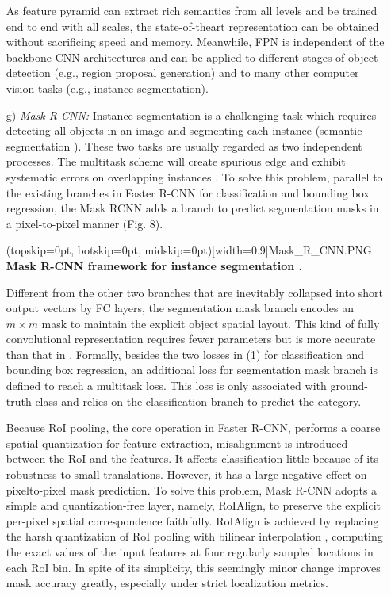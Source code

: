 \documentclass[two column]{ieeeaccess}
\begin{document}
\begin{itemize}
    As feature pyramid can extract rich semantics from all levels and be trained end to end with all scales, the state-of-theart representation can be obtained without sacrificing speed and memory. Meanwhile, FPN is independent of the backbone CNN architectures and can be applied to different stages of object detection (e.g., region proposal generation) and to many other computer vision tasks (e.g., instance segmentation). \\
    
    
    \item[g)]\textit{Mask R-CNN: } Instance segmentation \cite{96} is a challenging task which requires detecting all objects in an image and segmenting each instance (semantic segmentation \cite{97}). These two tasks are usually regarded as two independent processes. The multitask scheme will create spurious edge and exhibit systematic errors on overlapping instances \cite{98}. To solve this problem, parallel to the existing branches in Faster R-CNN for classification and bounding box regression, the Mask RCNN \cite{67} adds a branch to predict segmentation masks in a pixel-to-pixel manner (Fig. 8). 
    
      \Figure[ht](topskip=0pt, botskip=0pt, midskip=0pt)[width=0.9\linewidth]{Mask_R_CNN.PNG} {\textbf{Mask R-CNN framework for instance segmentation \cite{67}.}\label{fig8}}
      
    Different from the other two branches that are inevitably collapsed into short output vectors by FC layers, the segmentation mask branch encodes an $m \times m$ mask to maintain the explicit object spatial layout. This kind of fully convolutional
    representation requires fewer parameters but is more accurate than that in \cite{}. Formally, besides the two losses in (1) for classification and bounding box regression, an additional loss for segmentation mask branch is defined to reach a multitask loss. This loss is only associated with ground-truth class and relies on the classification branch to predict the category. 
    
    Because RoI pooling, the core operation in Faster R-CNN, performs a coarse spatial quantization for feature extraction, misalignment is introduced between the RoI and the features. It affects classification little because of its robustness to small translations. However, it has a large negative effect on pixelto-pixel mask prediction. To solve this problem, Mask R-CNN adopts a simple and quantization-free layer, namely, RoIAlign, to preserve the explicit per-pixel spatial correspondence faithfully. RoIAlign is achieved by replacing the harsh quantization of RoI pooling with bilinear interpolation \cite{99}, computing the exact values of the input features at four regularly sampled locations in each RoI bin. In spite of its simplicity, this seemingly minor change improves mask accuracy greatly, especially under strict localization metrics. 
    

\end{itemize}
\end{document}
